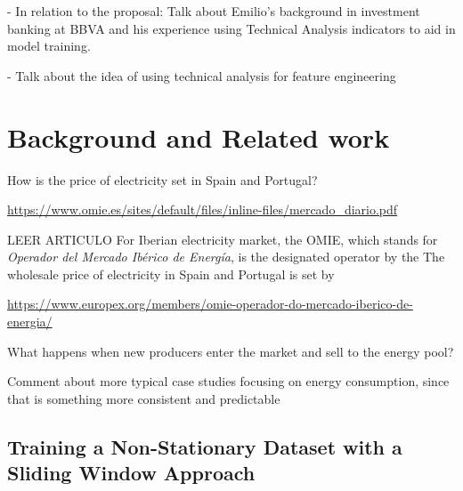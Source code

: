 \documentclass[12pt]{report} %
\begin{document}
- In relation to the proposal: Talk about Emilio's background in investment banking at BBVA and his experience using Technical Analysis indicators to aid in model training.

- Talk about the idea of using technical analysis for feature engineering



\chapter{Background and Related work}
How is the price of electricity set in Spain and Portugal?

\url{https://www.omie.es/sites/default/files/inline-files/mercado_diario.pdf}

LEER ARTICULO \cite{precio_electricidad_edem}
For Iberian electricity market, the OMIE, which stands for \textit{Operador del Mercado Ibérico de Energía}, is the designated operator by the
The wholesale price of electricity in Spain and Portugal is set by 

\url{https://www.europex.org/members/omie-operador-do-mercado-iberico-de-energia/}

What happens when new producers enter the market and sell to the energy pool?

Comment about more typical case studies focusing on energy consumption, since that is something more consistent and predictable


\section{Training a Non-Stationary Dataset with a Sliding Window Approach}
\end{document}
